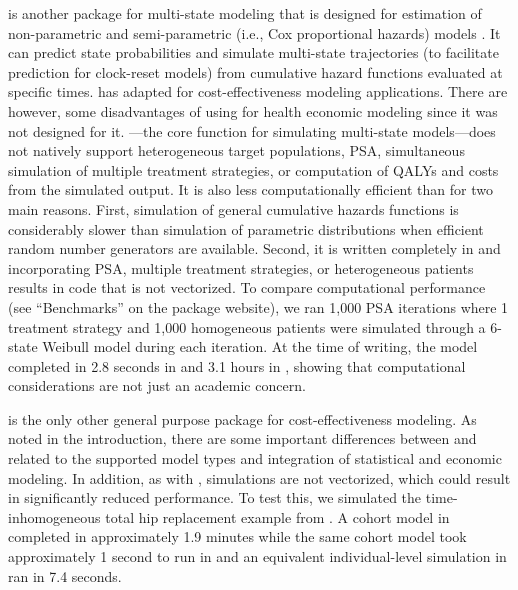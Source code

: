 \documentclass[article, nojss]{jss}\usepackage[]{graphicx}\usepackage[]{color}
\begin{document}
 is another package for multi-state modeling that is designed for estimation of non-parametric and semi-parametric (i.e., Cox proportional hazards) models \citep{de2011mstate}. It can predict state probabilities and simulate multi-state trajectories (to facilitate prediction for clock-reset models) from cumulative hazard functions evaluated at specific times. \citet{williams2017cost} has adapted  for cost-effectiveness modeling applications. There are however, some disadvantages of using  for health economic modeling since it was not designed for it. ---the core function for simulating multi-state models---does not natively support heterogeneous target populations, PSA, simultaneous simulation of multiple treatment strategies, or computation of QALYs and costs from the simulated output. It is also less computationally efficient than  for two main reasons. First, simulation of general cumulative hazards functions is considerably slower than simulation of parametric distributions when efficient random number generators are available. Second, it is written completely in  and incorporating PSA, multiple treatment strategies, or heterogeneous patients results in code that is not vectorized. To compare computational performance (see ``Benchmarks'' on the package website), we ran 1,000 PSA iterations where 1 treatment strategy and 1,000 homogeneous patients were simulated through a 6-state Weibull model during each iteration. At the time of writing, the model completed in 2.8 seconds in  and 3.1 hours in , showing that computational considerations are not just an academic concern. 

 is the only other general purpose  package for cost-effectiveness modeling. As noted in the introduction, there are some important differences between  and  related to the supported model types and integration of statistical and economic modeling. In addition, as with , simulations are not vectorized, which could result in significantly reduced performance. To test this, we simulated the time-inhomogeneous total hip replacement example from \citet{briggs2006decision}. A cohort model in  completed in approximately 1.9 minutes while the same cohort model took approximately 1 second to run in  and an equivalent individual-level simulation in  ran in 7.4 seconds.
\end{document}

